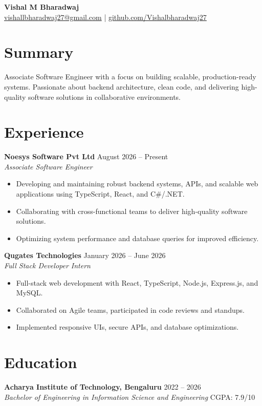 \documentclass[a4paper,11pt]{article}
\begin{document}
\begin{center}
    {\huge \textbf{Vishal M Bharadwaj}} \\
    \vspace{2pt}
    \small \href{mailto:vishallbharadwaj27@gmail.com}{vishallbharadwaj27@gmail.com} | \href{https://github.com/Vishalbharadwaj27}{github.com/Vishalbharadwaj27}
\end{center}

\section*{Summary}
Associate Software Engineer with a focus on building scalable, production-ready systems. Passionate about backend architecture, clean code, and delivering high-quality software solutions in collaborative environments.

\section*{Experience}
\textbf{Noesys Software Pvt Ltd} \hfill August 2026 – Present \\
\textit{Associate Software Engineer}
\begin{itemize}[noitemsep,topsep=0pt]
    \item Developing and maintaining robust backend systems, APIs, and scalable web applications using TypeScript, React, and C\#/.NET.
    \item Collaborating with cross-functional teams to deliver high-quality software solutions.
    \item Optimizing system performance and database queries for improved efficiency.
\end{itemize}

\textbf{Qugates Technologies} \hfill January 2026 – June 2026 \\
\textit{Full Stack Developer Intern}
\begin{itemize}[noitemsep,topsep=0pt]
    \item Full-stack web development with React, TypeScript, Node.js, Express.js, and MySQL.
    \item Collaborated on Agile teams, participated in code reviews and standups.
    \item Implemented responsive UIs, secure APIs, and database optimizations.
\end{itemize}

\section*{Education}
\textbf{Acharya Institute of Technology, Bengaluru} \hfill 2022 – 2026 \\
\textit{Bachelor of Engineering in Information Science and Engineering} \hfill CGPA: 7.9/10
\end{document}
